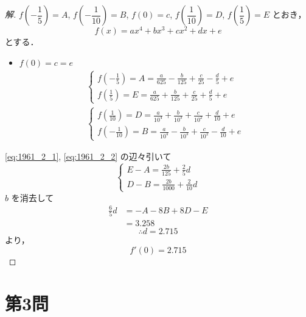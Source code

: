 \documentclass[../main.tex]{subfiles}
\begin{document}
\begin{proof}[解]
  $f\left(-\dfrac{1}{5}\right) = A$, $f\left(-\dfrac{1}{10}\right) = B$, $f(0) = c$, $f\left(\dfrac{1}{10}\right) = D$, $f\left(\dfrac{1}{5}\right) = E$ とおき，
  \[
    f(x) = ax^4 + bx^3 + cx^2 + dx + e
  \]
  とする．

  \begin{itemize}
    \item $f(0) = c = e$
      \begin{align}
        \begin{cases}
          f\left(-\frac{1}{5}\right) = A = \frac{a}{625} - \frac{b}{125} + \frac{c}{25} - \frac{d}{5} + e \\[5pt]
          f\left(\frac{1}{5}\right) = E = \frac{a}{625} + \frac{b}{125} + \frac{c}{25} + \frac{d}{5} + e
        \end{cases} \label{eq:1961_2_1} \\[5pt]
        \begin{cases}
          f\left(\frac{1}{10}\right) = D = \frac{a}{10^4} + \frac{b}{10^3} + \frac{c}{10^2} + \frac{d}{10} + e \\[5pt]
          f\left(-\frac{1}{10}\right) = B = \frac{a}{10^4} - \frac{b}{10^3} + \frac{c}{10^2} - \frac{d}{10} + e
        \end{cases} \label{eq:1961_2_2}
      \end{align}
  \end{itemize}

  \eqref{eq:1961_2_1}, \eqref{eq:1961_2_2} の辺々引いて
  \[
    \begin{cases}
      E - A = \frac{2b}{125} + \frac{2}{5}d \\[5pt]
      D - B = \frac{2b}{1000} + \frac{2}{10}d
    \end{cases}
  \]
  $b$ を消去して
  \begin{align*}
    \frac{6}{5}d &= -A - 8B + 8D - E \\
    &= 3.258
  \end{align*}
  \[
    \therefore d = 2.715
  \]
  より，
  \[
    f'(0) = 2.715
  \]
\end{proof}

\newpage

\section*{第3問}
\end{document}
